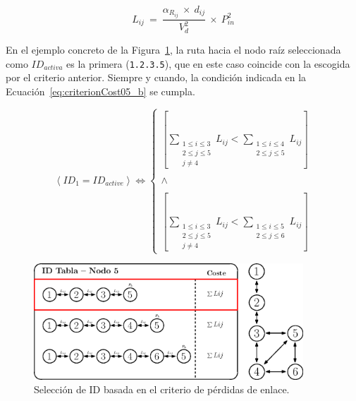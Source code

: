 \begin{equation}\label{eq:criterionCost04_b}
     L_{ij} \: = \: \frac{\alpha_{R_{ij}} \: \times \: d_{ij}}{V_{d}^{2}}\: \times \: P_{in}^{2}
\end{equation}
\vspace{0.2cm}

En el ejemplo concreto de la Figura~\ref{fig:den2ne_07}, la ruta hacia el nodo raíz seleccionada como $ID_{activa}$ es la primera (\texttt{1.2.3.5}), que en este caso coincide con la escogida por el criterio anterior. Siempre y cuando, la condición indicada en la Ecuación~\ref{eq:criterionCost05_b} se cumpla. 

\begin{equation}\label{eq:criterionCost05_b}
       \left \langle ID_{1} = ID_{active} \right \rangle \Leftrightarrow 
       \left\{\begin{matrix}
       [\sum_{\substack{1 \leq i \leq 3\\ 2 \leq j \leq 5\\ j \neq 4}}^{} L_{ij} < \sum_{\substack{1 \leq i \leq 4 \\  2 \leq j \leq 5}}^{} L_{ij}]\\
       \\
       \wedge \\ 
       \\
       [\sum_{\substack{1 \leq i \leq 3\\ 2 \leq j \leq 5\\ j \neq 4}}^{} L_{ij} < \sum_{\substack{1 \leq i \leq 5 \\ 2 \leq j \leq 6}}^{} L_{ij}]
       \end{matrix}\right.
\end{equation}
\vspace{0.2cm}

\begin{figure}[ht!]
    \centering
    \includegraphics[width=0.9\textwidth]{fig/05_den2ne/den2ne_07.eps}
    \caption{Selección de ID basada en el criterio de pérdidas de enlace.}
    \label{fig:den2ne_07}
\end{figure}

